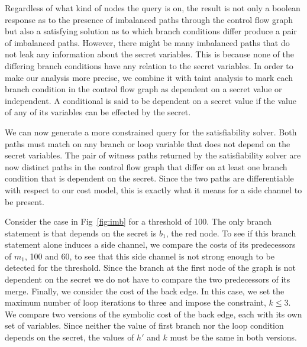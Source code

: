 Regardless of what kind of nodes the query is on, the result is not only a boolean response as to the presence of imbalanced paths through the control flow graph but also a satisfying solution as to which branch conditions differ produce a pair of imbalanced paths. However, there might be many imbalanced paths that do not leak any information about the secret variables. This is because none of the differing branch conditions have any relation to the secret variables. In order to make our analysis more precise, we combine it with taint analysis to mark each branch condition in the control flow graph as dependent on a secret value or independent. A conditional is said to be dependent on a secret value if the value of any of its variables can be effected by the secret.

We can now generate a more constrained query for the satisfiability solver. Both paths must match on any branch or loop variable that does not depend on the secret variables. The pair of witness paths returned by the satisfiability solver are now distinct paths in the control flow graph that differ on at least one branch condition that is dependent on the secret. Since the two paths are differentiable with respect to our cost model, this is exactly what it means for a side channel to be present. 

Consider the case in Fig~\ref{fig:imb} for a threshold of 100. The only branch statement is  that depends on the secret is $b_1$, the red node. To see if this branch statement alone induces a side channel, we compare the costs of its predecessors of $m_1$, 100 and 60, to see that this side channel is not strong enough to be detected for the threshold. Since the branch at the first node of the graph is not dependent on the secret we do not have to compare the two predecessors of its merge. Finally, we consider the cost of the back edge. In this case, we set the maximum number of loop iterations to three and impose the constraint, $k \leq 3$. We compare two versions of the symbolic cost of the back edge, each with its own set of variables. Since neither the value of first branch nor the loop condition depends on the secret, the values of $h'$ and $k$ must be the same in both versions. 